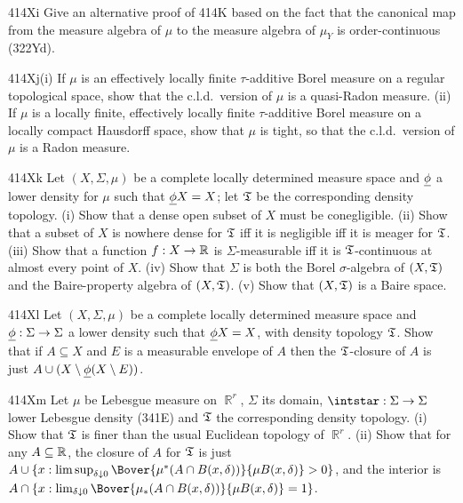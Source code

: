 {\spheader 414Xi Give an alternative proof of 414K based on the fact
that the canonical map from the measure algebra of $\mu$ to the measure
algebra of $\mu_Y$ is order-continuous (322Yd).

\sqheader 414Xj(i) If $\mu$ is an effectively locally finite
$\tau$-additive Borel measure on a regular topological space, show that
the c.l.d.\ version of $\mu$ is a quasi-Radon measure.
(ii) If $\mu$ is a locally finite, effectively locally finite
$\tau$-additive Borel measure on a locally compact Hausdorff space, show
that $\mu$ is tight, so that
the c.l.d.\ version of $\mu$ is a Radon measure.

\sqheader 414Xk Let $(X,\Sigma,\mu)$ be a complete locally determined
measure space and $\underline{\phi}$ a lower density for $\mu$ such that
$\underline{\phi} X=X$;  let $\frak T$ be the corresponding density topology.
(i) Show that a
dense open subset of $X$ must be conegligible.   (ii) Show that a subset
of $X$ is nowhere dense for $\frak T$ iff it is negligible iff it is
meager for $\frak T$.   (iii) Show that a function $f:X\to\Bbb R$ is
$\Sigma$-measurable iff it is $\frak T$-continuous at almost every point
of $X$.     (iv) Show that $\Sigma$ is both the
Borel $\sigma$-algebra of $(X,\frak T)$ and the Baire-property algebra of
$(X,\frak T)$.   (v) Show that $(X,\frak T)$ is a Baire space.

\spheader 414Xl Let $(X,\Sigma,\mu)$ be a complete locally determined
measure space and $\underline{\phi}:\Sigma\to\Sigma$ a lower density such that
$\underline{\phi} X=X$, with density topology $\frak T$.   Show that if
$A\subseteq X$ and $E$ is a measurable envelope of $A$ then the
$\frak T$-closure of $A$ is just
$A\cup(X\setminus\underline{\phi}(X\setminus E))$.

\spheader 414Xm Let $\mu$ be Lebesgue measure on $\BbbR^r$, $\Sigma$
its domain, $\intstar:\Sigma\to\Sigma$ lower Lebesgue density (341E) and
$\frak T$ the corresponding density topology.   (i) Show that $\frak T$ is
finer than the usual Euclidean topology of $\BbbR^r$.
(ii) Show that for any
$A\subseteq\Bbb R$, the closure of $A$ for $\frak T$ is just
$A\cup\{x:\limsup_{\delta\downarrow 0}
 \Bover{\mu^*(A\cap B(x,\delta))}{\mu B(x,\delta)}>0\}$, and the
interior is $A\cap\{x:\lim_{\delta\downarrow 0}
 \Bover{\mu_*(A\cap B(x,\delta))}{\mu B(x,\delta)}=1\}$.

}
